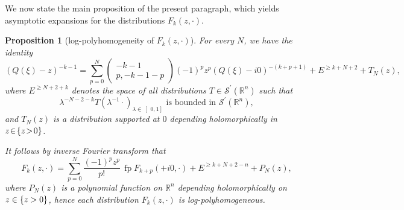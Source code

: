 \documentclass[JEP,XML,SOM,Unicode]{cedram}
\let\pazocal\mathscr
\newtheorem{proposition}[theorem]{Proposition}
\theoremstyle{definition}
\newcommand\rr{{\mathbb R}}
\let\Im\relax
\DeclareMathOperator{\Im}{Im}
\DeclareMathOperator*{\pf}{fp}
\newcommand{\opencl}[1]{\mathopen{}\mathclose{\left]#1 \right]}}
\begin{document}
We now state the main proposition of the present paragraph,
which yields asymptotic expansions for the distributions
$F_k(z,\cdot)$.

\begin{proposition}[log-polyhomogeneity of $F_k(z,\cdot) $]
\label{prop:logpolyF}
For every $N$, we have
the identity
\[
(Q(\xi)-z)^{-k-1}=\sum_{p=0}^N \begin{pmatrix}
-k-1\\
p,-k-1-p
\end{pmatrix} (-1)^pz^{p} (Q(\xi)-i0)^{-(k+p+1)}+E^{\geqslant k+N+2 }+T_N(z),
\]
where $E^{\geqslant N+2+k }$ denotes the space of all distributions $T\in \pazocal{S}^\prime(\rr^n)$ such that
\[
\lambda^{-N-2-k} T(\lambda^{-1}\cdot)_{\lambda\in \opencl{0,1}} \text{ is bounded in } \pazocal{S}^\prime(\rr^n),
\]
and $T_N(z)$ is a distribution supported at $0$ depending holomorphically in \hbox{$z\!\in\!\{\Im z\!>\!0\}$}.

It follows by inverse Fourier transform that
\begin{equation}\label{e:expansionF}
F_k(z,\cdot)=\sum_{p=0}^{N} \frac{(-1)^pz^{p}}{p!}\, {\pf F_{k+p}(+i0,\cdot)}
+E^{\geqslant k+N+2-n }+P_N(z),
\end{equation}
where $P_N(z)$ is a polynomial function on $\mathbb{R}^n$ depending holomorphically on $z\in\{\Im z>0\}$,
hence each distribution $F_k(z,\cdot)$ is log-polyhomogeneous.
\end{proposition}
\end{document}
